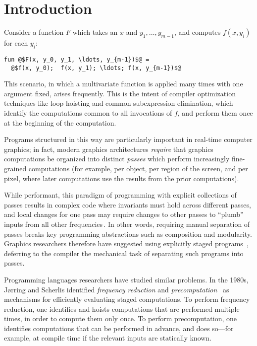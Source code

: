 \section{Introduction}

Consider a function $F$ which takes an $x$ and $y_1,\dots,y_{m-1}$, and computes
$f(x,y_i)$ for each $y_i$:
\begin{lstlisting}
fun @$F(x, y_0, y_1, \ldots, y_{m-1})$@ = 
  @$f(x, y_0);  f(x, y_1); \ldots; f(x, y_{m-1})$@
\end{lstlisting}
%
This scenario, in which a multivariate function is applied many times with one
argument fixed, arises frequently. 
This is the intent of compiler optimization techniques like loop hoisting and
common subexpression elimination, which identify the computations common to all
invocations of $f$, and perform them once at the beginning of the computation.

Programs structured in this way are particularly important in real-time computer
graphics; in fact, modern graphics architectures \emph{require} that graphics
computations be organized into distinct {\em passes} which perform increasingly
fine-grained computations (for example, per object, per region of the screen,
and per pixel, where later computations use the results from the prior
computations).

While performant, this paradigm of programming with explicit collections of
passes results in complex code where invariants must hold across different
passes, and local changes for one pass may require changes to other passes to
``plumb'' inputs from all other frequencies\,\cite{Foley:2011}.
%
In other words, requiring manual separation of passes breaks key programming
abstractions such as composition and modularity.
%
Graphics researchers therefore have suggested using explicitly staged programs
\,\cite{Proudfoot:2001,Foley:2011,He:2014}, deferring to the compiler the
mechanical task of separating such programs into passes.

Programming languages researchers have studied similar problems. In the 1980s,
J{\o}rring and Scherlis identified {\em frequency reduction} and {\em
precomputation}~\cite{JS86-staging} as mechanisms for efficiently evaluating
staged computations. To perform frequency reduction, one identifies and hoists
computations that are performed multiple times, in order to compute them only
once. To perform precomputation, one identifies computations that can be
performed in advance, and does so---for example, at compile time if the relevant
inputs are statically known.

